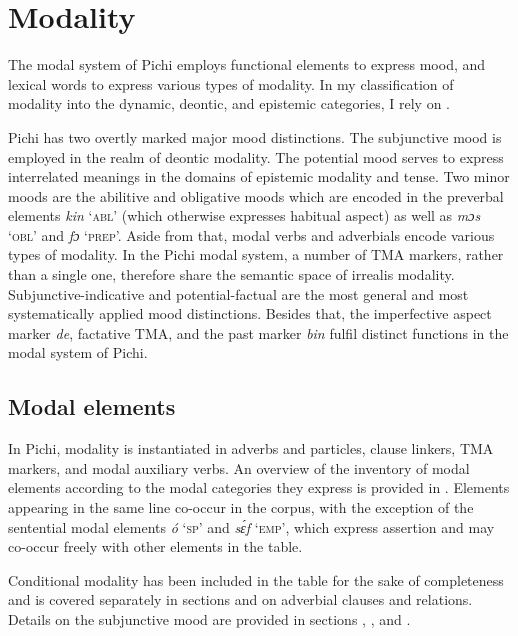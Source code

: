 \section{Modality}\label{sec:6.7}

The modal system of Pichi employs functional elements to express mood, and lexical words to express various types of modality. In my classification of modality into the dynamic, deontic, and epistemic categories, I rely on \citet{Palmer2001}.


Pichi has two overtly marked major mood distinctions. The subjunctive mood is employed in the realm of deontic modality. The potential mood serves to express interrelated meanings in the domains of epistemic modality and tense. Two minor moods are the abilitive and obligative moods which are encoded in the preverbal elements \textit{kin} ‘\textsc{abl’} (which otherwise expresses habitual aspect) as well as \textit{mɔs} ‘\textsc{obl}’ and \textit{fɔ} ‘\textsc{prep}’. Aside from that, modal verbs and adverbials encode various types of modality. In the Pichi modal system, a number of TMA markers, rather than a single one, therefore share the semantic space of irrealis modality. Subjunctive-indicative and potential-factual are the most general and most systematically applied mood distinctions. Besides that, the imperfective aspect marker \textit{de}, factative TMA, and the past marker \textit{bin} fulfil distinct functions in the modal system of Pichi. 


\subsection{Modal elements}\label{sec:6.7.1}

In Pichi, modality is instantiated in adverbs and particles, clause linkers, TMA markers, and modal auxiliary verbs. An overview of the inventory of modal elements according to the modal categories they express is provided in . Elements appearing in the same line co-occur in the corpus, with the exception of the sentential modal elements \textit{ó} ‘\textsc{sp}’ and \textit{sɛ́f} ‘\textsc{emp}’, which express assertion and may co-occur freely with other elements in the table.


Conditional modality has been included in the table for the sake of completeness and is covered separately in sections  and  on adverbial clauses and relations. Details on the subjunctive mood are provided in sections , , and .


